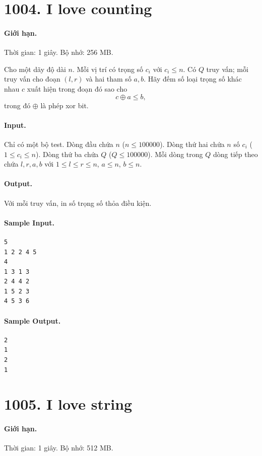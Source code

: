\documentclass[11pt]{article}
\begin{document}
\section{1004. I love counting}

\paragraph{Giới hạn.} Thời gian: 1 giây. Bộ nhớ: 256 MB.

Cho một dãy độ dài $n$.  Mỗi vị trí có trọng số $c_i$ với $c_i\le n$.  Có $Q$
truy vấn; mỗi truy vấn cho đoạn $(l,r)$ và hai tham số $a,b$.  Hãy đếm số loại
trọng số khác nhau $c$ xuất hiện trong đoạn đó sao cho
\[
  c\oplus a \le b,
\]
trong đó $\oplus$ là phép xor bit.

\paragraph{Input.}
Chỉ có một bộ test.  Dòng đầu chứa $n$ ($n\le 100000$).  Dòng thứ hai chứa
$n$ số $c_i$ ($1\le c_i\le n$).  Dòng thứ ba chứa $Q$ ($Q\le 100000$).  Mỗi
dòng trong $Q$ dòng tiếp theo chứa $l,r,a,b$ với
$1\le l\le r\le n$, $a\le n$, $b\le n$.

\paragraph{Output.}
Với mỗi truy vấn, in số trọng số thỏa điều kiện.

\paragraph{Sample Input.}
\begin{verbatim}
5
1 2 2 4 5
4
1 3 1 3
2 4 4 2
1 5 2 3
4 5 3 6
\end{verbatim}

\paragraph{Sample Output.}
\begin{verbatim}
2
1
2
1
\end{verbatim}

\section{1005. I love string}

\paragraph{Giới hạn.} Thời gian: 1 giây. Bộ nhớ: 512 MB.
\end{document}
